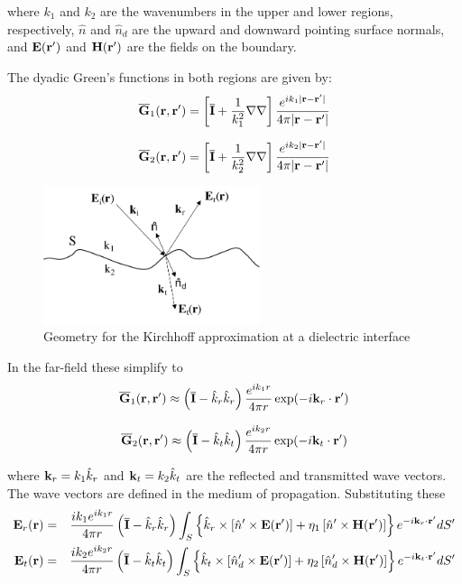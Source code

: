 \noindent where $k_1$ and $k_2$ are the wavenumbers in the upper and lower regions, respectively, $\hat{n}$ and $\hat{n}_d$ are the upward and downward pointing surface normals, and $\mathbf{E}(\mathbf{r}')$ and $\mathbf{H}(\mathbf{r}')$ are the fields on the boundary.  


The dyadic Green's functions in both regions are given by:
\begin{equation}
\overline{\mathbf{G}}_{1}(\mathbf{r},\mathbf{r}') = \left[ \overline{\mathbf{I}} + \dfrac{1}{k_1^2}\nabla\nabla\right] \dfrac{e^{ik_1\vert \mathbf{r} - \mathbf{r}'\vert}}{4\pi \vert \mathbf{r} - \mathbf{r}'\vert}
\end{equation}

\begin{equation}
\overline{\mathbf{G}}_{2}(\mathbf{r},\mathbf{r}') = \left[ \overline{\mathbf{I}} + \dfrac{1}{k_2^2}\nabla\nabla\right] \dfrac{e^{ik_2\vert \mathbf{r} - \mathbf{r}'\vert}}{4\pi \vert \mathbf{r} - \mathbf{r}'\vert}
\end{equation}



\begin{figure}[h] 
   \centering
   \includegraphics[width=2.5in]{Kirchhoff/Figures/kirchhoffgeometry} 
   \caption{Geometry for the Kirchhoff approximation at a dielectric interface}
     \label{kirchhoffgeo}
\end{figure}


In the far-field these simplify to
\begin{equation}
\overline{\mathbf{G}}_{1}(\mathbf{r},\mathbf{r}') \approx \left( \overline{\mathbf{I}} - \hat{k}_r \hat{k}_r \right) \dfrac{e^{ik_1r}}{4\pi r} \exp(-i \mathbf{k}_r \cdot \mathbf{r}') 
\end{equation}

\begin{equation}
\overline{\mathbf{G}}_{2}(\mathbf{r},\mathbf{r}') \approx \left( \overline{\mathbf{I}} - \hat{k}_t \hat{k}_t \right) \dfrac{e^{ik_2r}}{4\pi r} \exp(-i \mathbf{k}_t \cdot \mathbf{r}') 
\end{equation}

\noindent where $\mathbf{k}_r = k_1\hat{k}_r$ and $\mathbf{k}_t = k_2 \hat{k}_t$ are the reflected and transmitted wave vectors. The wave vectors are defined in the medium of propagation.  Substituting these
\begin{eqnarray}
\mathbf{E}_r(\mathbf{r}) & = & \dfrac{ik_1 e^{ik_1 r}}{4\pi r} \left( \overline{\mathbf{I}} - \hat{k}_r \hat{k}_r \right)  \int_S \left\{ \hat{k}_r \times \left[ \hat{n}' \times \mathbf{E}(\mathbf{r}')\right] + \eta_1\left[ \hat{n}' \times \mathbf{H}(\mathbf{r}')\right]\right\} e^{-i \mathbf{k}_r \cdot \mathbf{r}'} dS'   \\
\mathbf{E}_t(\mathbf{r}) & = & \dfrac{ik_2e^{ik_2r}}{4\pi r} \left( \overline{\mathbf{I}} - \hat{k}_t \hat{k}_t \right)  \int_S \left\{ \hat{k}_t \times \left[ \hat{n}_d' \times \mathbf{E}(\mathbf{r}')\right] + \eta_2\left[ \hat{n}_d' \times \mathbf{H}(\mathbf{r}')\right]\right\} e^{-i \mathbf{k}_t \cdot \mathbf{r}'}  dS'  
\end{eqnarray}

